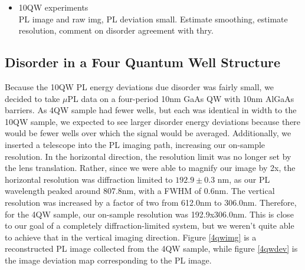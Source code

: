 \begin{itemize}
\item 10QW experiments\\
\* PL image and raw img, PL deviation small. Estimate smoothing, estimate resolution, comment on disorder agreement with thry.
\end{itemize}


\subsection{Disorder in a Four Quantum Well Structure}
Because the 10QW PL energy deviations due disorder was fairly small, we decided to take $\mu$PL data on a four-period 10nm GaAs QW with 10nm AlGaAs barriers. As 4QW sample had fewer wells, but each was identical in width to the 10QW sample, we expected to see larger disorder energy deviations because there would be fewer wells over which the signal would be averaged. Additionally, we inserted a telescope into the PL imaging path, increasing our on-sample resolution. In the horizontal direction, the resolution limit was no longer set by the lens translation. Rather, since we were able to magnify our image by 2x, the horizontal resolution was diffraction limited to $192.9\pm0.3$ nm, as our PL wavelength peaked around 807.8nm, with a FWHM of 0.6nm. The vertical resolution was increased by a factor of two from 612.0nm to 306.0nm. Therefore, for the 4QW sample, our on-sample resolution was 192.9x306.0nm. This is close to our goal of a completely diffraction-limited system, but we weren't quite able to achieve that in the vertical imaging direction. Figure \ref{4qwimg} is a reconstructed PL image collected from the 4QW sample, while figure \ref{4qwdev} is the image deviation map corresponding to the PL image.

